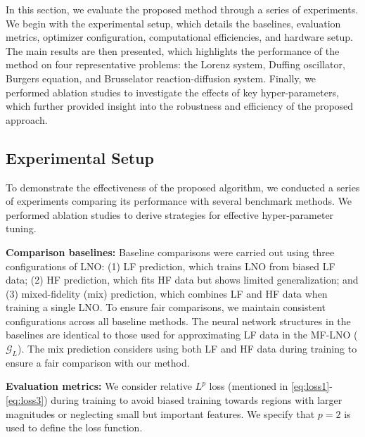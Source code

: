 
In this section, we evaluate the proposed method through a series of experiments. We begin with the experimental setup, which details the baselines, evaluation metrics, optimizer configuration, computational efficiencies, and hardware setup. The main results are then presented, which highlights the performance of the method on four representative problems: the Lorenz system, Duffing oscillator, Burgers equation, and Brusselator reaction-diffusion system. Finally, we performed ablation studies to investigate the effects of key hyper-parameters, which further provided insight into the robustness and efficiency of the proposed approach.

\subsection{Experimental Setup}

To demonstrate the effectiveness of the proposed algorithm, we conducted a series of experiments comparing its performance with several benchmark methods. We performed ablation studies to derive strategies for effective hyper-parameter tuning. 

\textbf{Comparison baselines:} Baseline comparisons were carried out using three configurations of LNO: (1) LF prediction, which trains LNO from biased LF data; (2) HF prediction, which fits HF data but shows limited generalization; and (3) mixed-fidelity (mix) prediction, which combines LF and HF data when training a single LNO. To ensure fair comparisons, we maintain consistent configurations across all baseline methods. The neural network structures in the baselines are identical to those used for approximating LF data in the MF-LNO ($\mathcal G_L$). The mix prediction considers using both LF and HF data during training to ensure a fair comparison with our method. 

\textbf{Evaluation metrics:} We consider relative $L^p$ loss (mentioned in \eqref{eq:loss1}-\eqref{eq:loss3}) during training to avoid biased training towards regions with larger magnitudes or neglecting small but important features. We specify that $p=2$ is used to define the loss function. 

